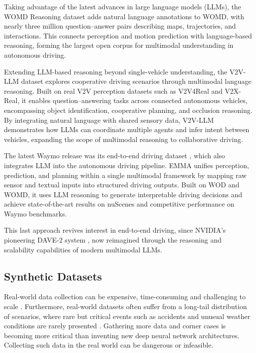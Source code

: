 Taking advantage of the latest advances in large language models (LLMs), the WOMD Reasoning dataset \cite{li2024womd} adds natural language annotations to WOMD, with nearly three million question–answer pairs describing maps, trajectories, and interactions. This connects perception and motion prediction with language-based reasoning, forming the largest open corpus for multimodal understanding in autonomous driving.

Extending LLM-based reasoning beyond single-vehicle understanding, the V2V-LLM dataset \cite{chiu2025v2vllmvehicletovehiclecooperativeautonomous} explores cooperative driving scenarios through multimodal language reasoning. Built on real V2V perception datasets such as V2V4Real and V2X-Real, it enables question–answering tasks across connected autonomous vehicles, encompassing object identification, cooperative planning, and occlusion reasoning. By integrating natural language with shared sensory data, V2V-LLM demonstrates how LLMs can coordinate multiple agents and infer intent between vehicles, expanding the scope of multimodal reasoning to collaborative driving.

The latest Waymo release was its end-to-end driving dataset \cite{hwang2025emma}, which also integrates LLM into the autonomous driving pipeline. EMMA unifies perception, prediction, and planning within a single multimodal framework by mapping raw sensor and textual inputs into structured driving outputs. Built on WOD and WOMD, it uses LLM reasoning to generate interpretable driving decisions and achieve state-of-the-art results on nuScenes and competitive performance on Waymo benchmarks.

This last approach revives interest in end-to-end driving, since NVIDIA’s pioneering DAVE-2 system \cite{bojarski2016endendlearningselfdriving}, now reimagined through the reasoning and scalability capabilities of modern multimodal LLMs.

\subsection{Synthetic Datasets}

Real-world data collection can be expensive, time-consuming and challenging to scale \cite{feng2020}. Furthermore, real-world datasets often suffer from a long-tail distribution of scenarios, where rare but critical events such as accidents and unusual weather conditions are rarely presented \cite{song2024}. Gathering more data and corner cases is becoming more critical than inventing new deep neural network architectures. Collecting such data in the real world can be dangerous or infeasible. 

